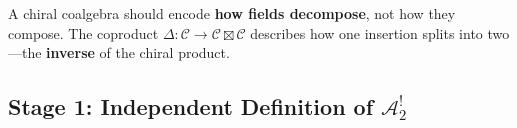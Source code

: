 \begin{principle}
A chiral coalgebra should encode \textbf{how fields decompose}, not how they compose. The coproduct $\Delta: \mathcal{C} \to \mathcal{C} \boxtimes \mathcal{C}$ describes how one insertion splits into two---the \textbf{inverse} of the chiral product.
\end{principle}


\subsection{Stage 1: Independent Definition of $\mathcal{A}_2^!$}

